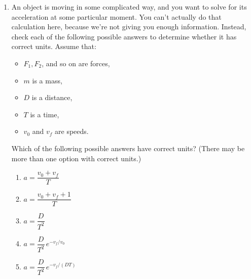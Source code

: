 \documentclass[12pt]{article}
\begin{document}
\begin{enumerate}
  \item An object is moving in some complicated way, and you want to solve
        for its acceleration at some particular moment. You can't actually do
        that calculation here, because we're not giving you enough
        information. Instead, check each of the following possible answers to
        determine whether it has correct units. Assume that:
  \begin{itemize}
    \item $F_{1}, F_{2}$, and so on are forces,
    \item $m$ is a mass,
    \item $D$ is a distance,
    \item $T$ is a time,
    \item $v_{0}$ and $v_{f}$ are speeds.
  \end{itemize}
  Which of the following possible answers have correct units? (There may be
  more than one option with correct units.)
  \begin{enumerate}[label = \alph*.]
    \item $a = \dfrac{v_{0} + v_{f}}{T}$
    \item $a = \dfrac{v_{0} + v_{f} + 1}{T}$
    \item $a = \dfrac{D}{T^{2}}$
    \item $a = \dfrac{D}{T^{2}}\,e^{-v_{f}/v_{0}}$
    \item $a = \dfrac{D}{T^{2}}\,e^{-v_{f}/(D T)}$
  \end{enumerate}
\end{enumerate}
\end{document}
